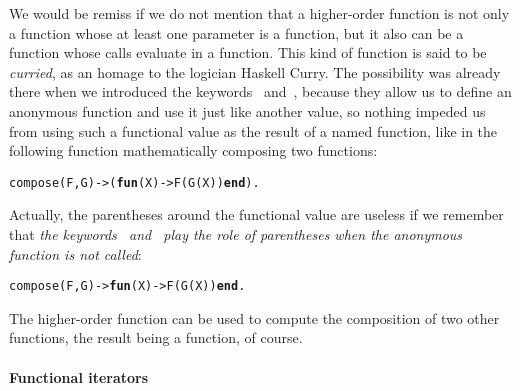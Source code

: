 We would be remiss if we do not mention that a higher\hyp{}order
function is not only a function whose at least one parameter is a
function, but it also can be a function whose calls evaluate in a
function. This kind of function is said to be
\emph{curried}, as an homage to the logician Haskell Curry. The
possibility was already there when we introduced the keywords
~and~, because they allow us to define an
anonymous function and use it just like another value, so nothing
impeded us from using such a functional value as the result of a named
function, like in the following function mathematically composing two
functions:
\begin{alltt}
compose(F,G) -> (\textbf{fun}(X) -> F(G(X)) \textbf{end}).
\end{alltt}
Actually, the parentheses around the functional value are useless if
we remember that \emph{the keywords ~and~ play the
role of parentheses when the anonymous function is not called}:
\begin{alltt}
compose(F,G) -> \textbf{fun}(X) -> F(G(X)) \textbf{end}.
\end{alltt}
The higher\hyp{}order function  can be used to
compute the composition of two other functions, the result being a
function, of course.

\medskip

\paragraph{Functional iterators}
\label{par:maps}

